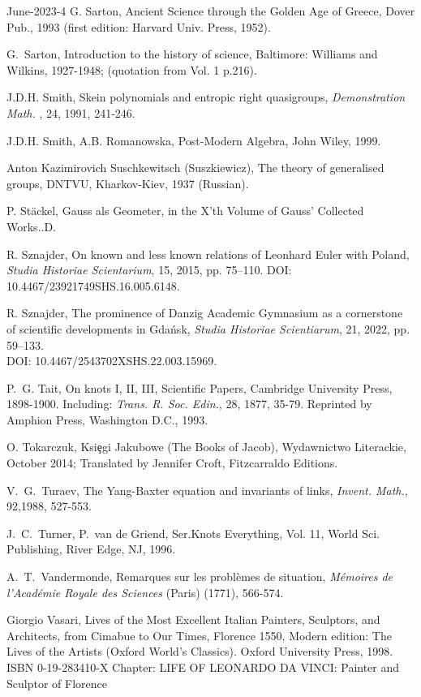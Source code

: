 \documentclass[12pt]{amsart}
\begin{document}
\begin{thebibliography}{June-2023-4}
G. Sarton, Ancient Science through the Golden Age of Greece, Dover Pub., 1993
(first edition: Harvard Univ. Press, 1952).

G.~Sarton,
Introduction to the history of science, Baltimore: Williams
and Wilkins, 1927-1948; (quotation from Vol. 1 p.216).

 J.D.H. Smith, Skein polynomials and entropic right quasigroups, 
{\it Demonstration Math. }, 24, 1991, 241-246.

 J.D.H. Smith, A.B. Romanowska, Post-Modern Algebra, John Wiley, 1999.

 Anton Kazimirovich Suschkewitsch (Suszkiewicz),  The theory of generalised groups, DNTVU, Kharkov-Kiev, 1937
(Russian).

P. St\"ackel,
Gauss als Geometer, in the X'th Volume of Gauss' Collected Works..D.

 R. Sznajder, 
On known and less known relations of Leonhard Euler with Poland,
{\it Studia Historiae Scientarium}, 15, 2015, pp. 75–110. DOI: 10.4467/23921749SHS.16.005.6148.

 R. Sznajder, 
The prominence of Danzig Academic Gymnasium as a cornerstone of scientific developments in Gda\'nsk, {\it Studia Historiae Scientiarum}, 21, 2022, pp. 59–133.\\
DOI: 10.4467/2543702XSHS.22.003.15969.

 P.~G. Tait, On knots I,  II, III,  Scientific Papers,  Cambridge
 University Press, 1898-1900. Including: {\it Trans. R. Soc. Edin.},
28, 1877, 35-79.
Reprinted by Amphion Press, Washington D.C., 1993.

 O. Tokarczuk, Ksi{\c e}gi Jakubowe (The Books of Jacob), Wydawnictwo Literackie, October 2014; Translated by Jennifer Croft,  Fitzcarraldo Editions.

V.~G.~Turaev, The Yang-Baxter equation and invariants of links,
{\it Invent. Math.}, 92,1988, 527-553.

J.~C.~Turner, P.~van de Griend,
Ser.Knots Everything, Vol. 11, World Sci. Publishing, River Edge, NJ, 1996.

A.~T.~Vandermonde,  Remarques sur les probl\`emes de situation,
{\it M\'emoires de l'Acad\'emie Royale des Sciences} (Paris) (1771),
566-574.

Giorgio Vasari, Lives of the Most Excellent Italian Painters, Sculptors, and Architects, from Cimabue to Our Times,
Florence 1550, Modern edition:
 The Lives of the Artists (Oxford World's Classics). Oxford University Press, 1998. ISBN 0-19-283410-X
Chapter: LIFE OF LEONARDO DA VINCI: Painter and Sculptor of Florence


\end{thebibliography}
\end{document}
